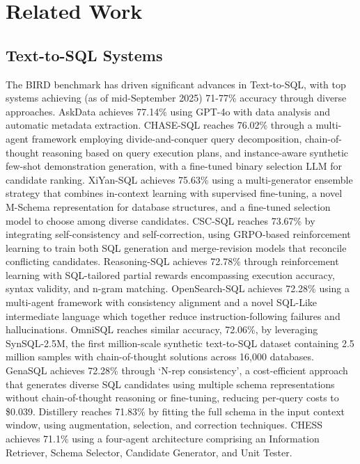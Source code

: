 \documentclass{article}
\begin{document}
\section{Related Work}

\subsection{Text-to-SQL Systems}
The BIRD benchmark \citep{bird2023} has driven significant advances in Text-to-SQL, with top systems achieving (as of mid-September 2025) 71-77\% accuracy through diverse approaches.
AskData \citep{askdata2025} achieves 77.14\% using GPT-4o with data analysis and automatic metadata extraction. 
CHASE-SQL \citep{chase2024} reaches 76.02\% through a multi-agent framework employing divide-and-conquer query decomposition, chain-of-thought reasoning based on query execution plans, and instance-aware synthetic few-shot demonstration generation, with a fine-tuned binary selection LLM for candidate ranking. 
XiYan-SQL \citep{xiyan2025} achieves 75.63\% using a multi-generator ensemble strategy that combines in-context learning with supervised fine-tuning, a novel M-Schema representation for database structures, and a fine-tuned selection model to choose among diverse candidates. 
CSC-SQL \citep{csc2025} reaches 73.67\% by integrating self-consistency and self-correction, using GRPO-based reinforcement learning to train both SQL generation and merge-revision models that reconcile conflicting candidates. 
Reasoning-SQL \citep{reasoning2025} achieves 72.78\% through reinforcement learning with SQL-tailored partial rewards encompassing execution accuracy, syntax validity, and n-gram matching.
OpenSearch-SQL \citep{opensearch2025} achieves 72.28\% using a multi-agent framework with consistency alignment and a novel SQL-Like intermediate language which together reduce instruction-following failures and hallucinations. 
OmniSQL \citep{omnisql2025} reaches similar accuracy, 72.06\%, by leveraging SynSQL-2.5M, the first million-scale synthetic text-to-SQL dataset containing 2.5 million samples with chain-of-thought solutions across 16,000 databases. 
GenaSQL \citep{genasql2025} achieves 72.28\% through `N-rep consistency', a cost-efficient approach that generates diverse SQL candidates using multiple schema representations without chain-of-thought reasoning or fine-tuning, reducing per-query costs to \$0.039.
Distillery \citep{distillery2024} reaches 71.83\% by fitting the full schema in the input context window, using augmentation, selection, and correction techniques. 
CHESS \citep{chess2024} achieves 71.1\% using a four-agent architecture comprising an Information Retriever, Schema Selector, Candidate Generator, and Unit Tester.
\end{document}

